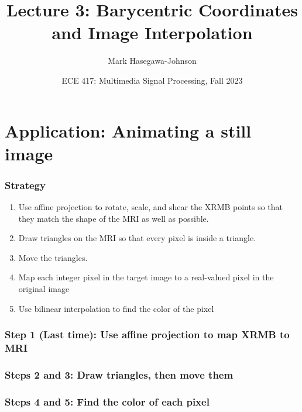 \documentclass{beamer}
\title{Lecture 3: Barycentric Coordinates and Image Interpolation}
\author{Mark Hasegawa-Johnson}
\date{ECE 417: Multimedia Signal Processing, Fall 2023}
\institute{University of Illinois}
\begin{document}
\begin{frame}
  \maketitle
\end{frame}

\begin{frame}
  \tableofcontents
\end{frame}

\section{Application: Animating a still image}
\setcounter{subsection}{1}

\begin{frame}
  \frametitle{Strategy}
  \begin{enumerate}
  \item Use affine projection to rotate, scale, and shear the XRMB
    points so that they match the shape of the MRI as well as possible.
  \item Draw triangles on the MRI so that every pixel is inside a triangle.
  \item Move the triangles.
  \item Map each integer pixel in the target image to a real-valued pixel in the original image
  \item Use bilinear interpolation to find the color of the pixel 
  \end{enumerate}
\end{frame}

\begin{frame}
  \frametitle{Step 1 (Last time): Use affine projection to map XRMB to MRI}
  \centerline{}
\end{frame}

\begin{frame}
  \frametitle{Steps 2 and 3: Draw triangles, then move them}
  \centerline{}
\end{frame}

\begin{frame}
  \frametitle{Steps 4 and 5: Find the color of each pixel}
  \centerline{}
\end{frame}
\end{document}
